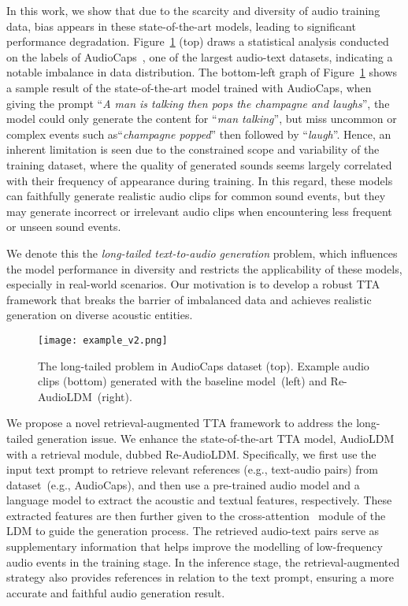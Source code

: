 \documentclass{article}
\begin{document}
In this work, we show that due to the scarcity and diversity of audio training data, bias appears in these state-of-the-art models, leading to significant performance degradation. Figure~\ref{frequency} (top) draws a statistical analysis conducted on the  labels of AudioCaps~\cite{audiocaps}, one of the largest audio-text datasets, indicating a notable imbalance in data distribution. The bottom-left graph of Figure~\ref{frequency} shows a sample result of the state-of-the-art model trained with AudioCaps, when giving the prompt ``\textit{A man is talking then pops the champagne and laughs}'', the model could only generate the content for ``\textit{man talking}'', but miss uncommon or complex events such as``\textit{champagne popped}'' then followed by ``\textit{laugh}''. Hence, an inherent limitation is seen due to the constrained scope and variability of the training dataset, where the quality of generated sounds seems largely correlated with their frequency of appearance during training. In this regard, these models can faithfully generate realistic audio clips for common sound events, but they may generate incorrect or irrelevant audio clips when encountering less frequent or unseen sound events. 

We denote this the \textit{long-tailed text-to-audio generation} problem, which influences the model performance in diversity and restricts the applicability of these models, especially in real-world scenarios. 
Our motivation is to develop a robust TTA framework that breaks the barrier of imbalanced data and achieves realistic generation on diverse acoustic entities.

\begin{figure}[t]
    \centering
    \texttt{[image: example\_v2.png]}
    \vspace{-6mm}
    \caption{The long-tailed problem in AudioCaps dataset (top). Example audio clips (bottom) generated with the baseline model~(left) and Re-AudioLDM~(right). }
    \label{frequency}
    \vspace{-1em}
\end{figure}

We propose a novel retrieval-augmented TTA framework to address the long-tailed generation issue. We enhance the state-of-the-art TTA model, AudioLDM~\cite{audioldm} with a retrieval module, dubbed Re-AudioLDM.
Specifically, we first use the input text prompt to retrieve relevant references (e.g., text-audio pairs) from dataset~(e.g., AudioCaps), and then use a pre-trained audio model and a language model to extract the acoustic and textual features, respectively. These extracted features are then further given to the cross-attention~\cite{transformer} module of the LDM to guide the generation process. The retrieved audio-text pairs serve as supplementary information that helps improve the modelling of low-frequency audio events in the training stage. In the inference stage, the retrieval-augmented strategy also provides references in relation to the text prompt, ensuring a more accurate and faithful audio generation result. 
\end{document}
